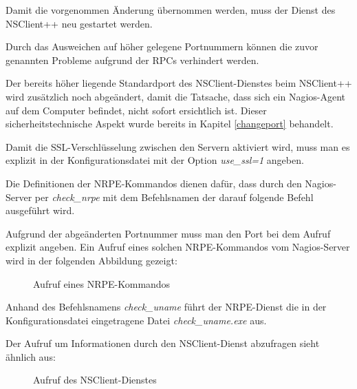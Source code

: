 Damit die vorgenommen Änderung übernommen werden, muss der Dienst des NSClient++ neu gestartet werden. 


Durch das Ausweichen auf höher gelegene Portnummern können die zuvor genannten Probleme aufgrund der \gls{RPC}s verhindert werden.

Der bereits höher liegende Standardport des NSClient-Dienstes beim NSClient++ wird zusätzlich noch abgeändert, damit die Tatsache, dass sich ein Nagios-Agent auf dem Computer befindet, nicht sofort ersichtlich ist.
Dieser sicherheitstechnische Aspekt wurde bereits in Kapitel \ref{changeport} behandelt.

Damit die \gls{SSL}-Verschlüsselung zwischen den Servern aktiviert wird, muss man es explizit in der Konfigurationsdatei mit der Option \textit{use\_ssl=1} angeben.

Die Definitionen der \gls{NRPE}-Kommandos dienen dafür, dass durch den Nagios-Server per \textit{check\_nrpe} mit dem Befehlsnamen der darauf folgende Befehl ausgeführt wird.

Aufgrund der abgeänderten Portnummer muss man den Port bei dem Aufruf explizit angeben.
Ein Aufruf eines solchen \gls{NRPE}-Kommandos vom Nagios-Server wird in der folgenden Abbildung gezeigt:

\begin{figure}[ht]
	\centering
		\caption{Aufruf eines NRPE-Kommandos}
		\label{nrpecheck}
\end{figure}



Anhand des Befehlsnamens \textit{check\_uname} führt der \gls{NRPE}-Dienst die in der Konfigurationsdatei eingetragene Datei \textit{check\_uname.exe} aus.

Der Aufruf um Informationen durch den NSClient-Dienst abzufragen sieht ähnlich aus:

\begin{figure}[ht]
	\centering
		\caption{Aufruf des NSClient-Dienstes}
		\label{ntcheck}
\end{figure}

